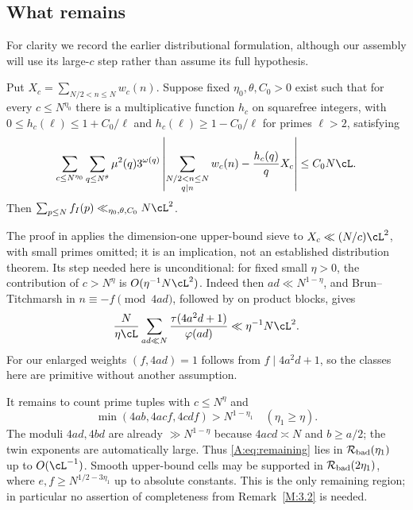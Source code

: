 \subsection{What remains}
For clarity we record the earlier distributional formulation, although our
assembly will use its large-$c$ step rather than assume its full hypothesis.
\begin{theorem}\label{M:3.8}
Put $X_c=\sum_{N/2<n\le N}w_c(n)$. Suppose fixed $\eta_0,\theta,C_0>0$
exist such that for every $c\le N^{\eta_0}$ there is a multiplicative
function $h_c$ on squarefree integers, with
$0\le h_c(\ell)\le1+C_0/\ell$ and
$h_c(\ell)\ge1-C_0/\ell$ for primes $\ell>2$, satisfying
\[
 \sum_{c\le N^{\eta_0}}\sum_{q\le N^\theta}\mu^2(q)3^{\omega(q)}
 \left|\sum_{\substack{N/2<n\le N\\q\mid n}}w_c(n)
                       -\frac{h_c(q)}qX_c\right|\le C_0N\cL.
\]
Then $\sum_{p\le N}f_I(p)\ll_{\eta_0,\theta,C_0}N\cL^2$.
\end{theorem}
The proof in \cite[\S3.7]{MN3} applies the dimension-one upper-bound sieve
to $X_c\ll (N/c)\cL^2$, with small primes omitted; it is an implication,
not an established distribution theorem. Its step needed here is
unconditional: for fixed small $\eta>0$, the contribution of $c>N^\eta$
is $O(\eta^{-1}N\cL^2)$. Indeed then $ad\ll N^{1-\eta}$, and
Brun--Titchmarsh in $n\equiv-f\pmod{4ad}$, followed by
\cite[(8.2)]{ET} on product blocks, gives
\[
 \frac{N}{\eta\cL}\sum_{ad\ll N}\frac{\tau(4a^2d+1)}{\varphi(ad)}
       \ll\eta^{-1}N\cL^2.
\]
For our enlarged weights $(f,4ad)=1$ follows from $f\mid4a^2d+1$, so the
classes here are primitive without another assumption.

It remains to count prime tuples with $c\le N^\eta$ and
\begin{equation}\label{A:eq:remaining}
 \min(4ab,4acf,4cdf)>N^{1-\eta_1}\quad(\eta_1\ge\eta).
\end{equation}
The moduli $4ad,4bd$ are already $\gg N^{1-\eta}$ because
$4acd\asymp N$ and $b\ge a/2$; the twin exponents are automatically large.
Thus \eqref{A:eq:remaining} lies in $\mathcal R_{\rm bad}(\eta_1)$ up to
$O(\cL^{-1})$. Smooth upper-bound cells may be supported in
$\mathcal R_{\rm bad}(2\eta_1)$, where
$e,f\ge N^{1/2-3\eta_1}$ up to absolute constants. This is the only
remaining region; in particular no assertion of completeness from
Remark~\ref{M:3.2} is needed.


